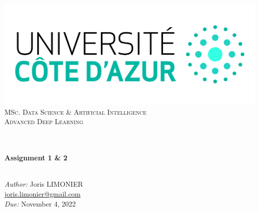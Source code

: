 \begin{titlepage}
	\begin{center}
		\includegraphics[width=\textwidth]{images/logo_uca.jpeg}\\[0.1cm]
		\vspace{1.5cm}
		\textsc{\Large MSc. Data Science \& Artificial Intelligence}\\[1.2cm]
		\textsc{\Large Advanced Deep Learning}\\[1.2cm]
		\\
		\vspace{1cm}

		\HRule \\[0.6cm]
		{\huge \bfseries Assignment 1 \& 2}\\[0.3cm]
		\HRule \\[1.8cm]
		\vfill

		\large
		\emph{Author:} Joris LIMONIER\\[.2cm]
		\href{mailto:joris.limonier@gmail.com}{\color{black}joris.limonier@gmail.com} \\[.2cm]
		\emph{Due:} {\large November 4, 2022}
	\end{center}
\end{titlepage}


